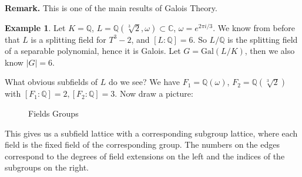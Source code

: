 \documentclass{article}
\theoremstyle{definition}
\newtheorem{example}{Example}[section]
\begin{document}
\textbf{Remark.} This is one of the main results of Galois Theory.
\begin{example}
    Let $K = \mathbb{Q}$, $L = \mathbb{Q}(\sqrt[3]{2},\omega) \subset \mathbb{C}$, $\omega = e^{2 \pi i /3}$. We know from before that $L$ is a splitting field for $T^3-2$, and $[L:\mathbb{Q}]=6$. So $L/\mathbb{Q}$ is the splitting field of a separable polynomial, hence it is Galois. Let $G = \text{Gal}(L/K)$, then  we also know $|G|=6$.
    \vspace{1mm}

    What obvious subfields of $L$ do we see? We have $F_1 = \mathbb{Q}(\omega)$, $F_2 = \mathbb{Q}(\sqrt[3]{2})$ with $[F_1 : \mathbb{Q}] = 2, [F_2 : \mathbb{Q}] = 3$. Now draw a picture:

    \begin{figure}[H]
        \centering
        \captionsetup{labelformat=empty}
    \caption{\hspace{6mm} Fields \hspace{35mm} Groups}
    \end{figure}

    This gives us a subfield lattice with a corresponding subgroup lattice, where each field is the fixed field of the corresponding group. The numbers on the edges correspond to the degrees of field extensions on the left and the indices of the subgroups on the right.
    \vspace{1mm}


\end{example}
\end{document}
